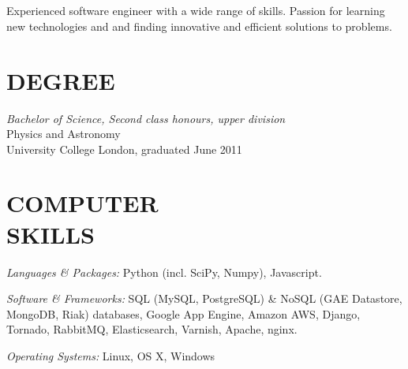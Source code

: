 \documentclass[margin, 10pt]{res} %
\begin{document}
\begin{resume}

 
\section{}

Experienced software engineer with a wide range of skills. Passion for learning new technologies and and finding innovative and efficient solutions to problems.


\section{DEGREE}

{\sl Bachelor of Science, Second class honours, upper division} \\
Physics and Astronomy \\
University College London, graduated June 2011
 

\section{COMPUTER \\ SKILLS} 

{\sl Languages \& Packages:} 
Python (incl. SciPy, Numpy), Javascript.

{\sl Software \& Frameworks:} 
SQL (MySQL, PostgreSQL) \& NoSQL (GAE Datastore, MongoDB, Riak) databases, Google App Engine, Amazon AWS, Django, Tornado, RabbitMQ, Elasticsearch, Varnish, Apache, nginx.

{\sl Operating Systems:} Linux, OS X, Windows
 
 

\end{resume}
\end{document}
